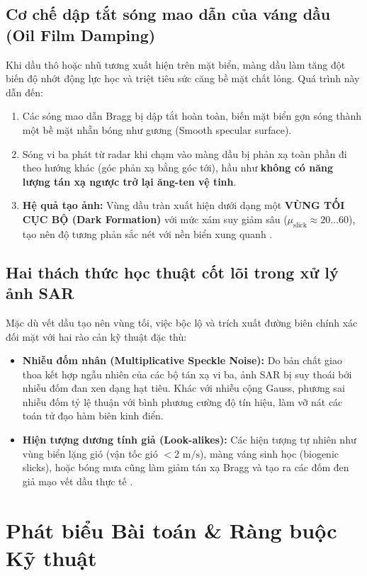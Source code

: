 \subsection{Cơ chế dập tắt sóng mao dẫn của váng dầu (Oil Film Damping)}
Khi dầu thô hoặc nhũ tương xuất hiện trên mặt biển, màng dầu làm tăng đột biến độ nhớt động lực học và triệt tiêu sức căng bề mặt chất lỏng. Quá trình này dẫn đến:
\begin{enumerate}
    \item Các sóng mao dẫn Bragg bị dập tắt hoàn toàn, biến mặt biển gợn sóng thành một bề mặt nhẵn bóng như gương (Smooth specular surface).
    \item Sóng vi ba phát từ radar khi chạm vào màng dầu bị phản xạ toàn phần đi theo hướng khác (góc phản xạ bằng góc tới), hầu như \textbf{không có năng lượng tán xạ ngược trở lại ăng-ten vệ tinh}.
    \item \textbf{Hệ quả tạo ảnh:} Vùng dầu tràn xuất hiện dưới dạng một \textbf{VÙNG TỐI CỤC BỘ (Dark Formation)} với mức xám suy giảm sâu ($\mu_{\text{slick}} \approx 20 \dots 60$), tạo nên độ tương phản sắc nét với nền biển xung quanh \cite{topouzelis2008oil}.
\end{enumerate}

\subsection{Hai thách thức học thuật cốt lõi trong xử lý ảnh SAR}
Mặc dù vết dầu tạo nên vùng tối, việc bộc lộ và trích xuất đường biên chính xác đối mặt với hai rào cản kỹ thuật đặc thù:
\begin{itemize}
    \item \textbf{Nhiễu đốm nhân (Multiplicative Speckle Noise):} Do bản chất giao thoa kết hợp ngẫu nhiên của các bộ tán xạ vi ba, ảnh SAR bị suy thoái bởi nhiễu đốm đan xen dạng hạt tiêu. Khác với nhiễu cộng Gauss, phương sai nhiễu đốm tỷ lệ thuận với bình phương cường độ tín hiệu, làm vỡ nát các toán tử đạo hàm biên kinh điển.
    \item \textbf{Hiện tượng dương tính giả (Look-alikes):} Các hiện tượng tự nhiên như vùng biển lặng gió (vận tốc gió $< 2\text{ m/s}$), màng váng sinh học (biogenic slicks), hoặc bóng mưa cũng làm giảm tán xạ Bragg và tạo ra các đốm đen giả mạo vết dầu thực tế \cite{brekke2005oil}.
\end{itemize}



\section{Phát biểu Bài toán \& Ràng buộc Kỹ thuật}
